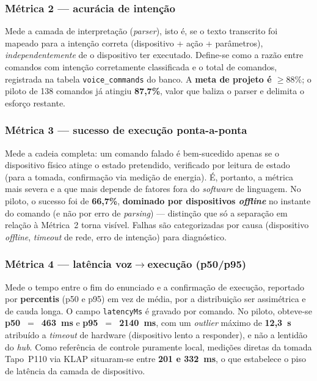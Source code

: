 \subsubsection{Métrica 2 --- acurácia de intenção}

Mede a camada de interpretação (\textit{parser}), isto é, se o texto transcrito foi
mapeado para a intenção correta (dispositivo + ação + parâmetros), \emph{independentemente}
de o dispositivo ter executado. Define-se como a razão entre comandos com intenção
corretamente classificada e o total de comandos, registrada na tabela
\texttt{voice\_commands} do banco. A \textbf{meta de projeto é $\geq 88\%$}; o piloto de
138 comandos já atingiu \textbf{87,7\%}, valor que baliza o parser e delimita o esforço
restante.

\subsubsection{Métrica 3 --- sucesso de execução ponta-a-ponta}

Mede a cadeia completa: um comando falado é bem-sucedido apenas se o dispositivo físico
atinge o estado pretendido, verificado por leitura de estado (para a tomada, confirmação
via medição de energia). É, portanto, a métrica mais severa e a que mais depende de
fatores fora do \textit{software} de linguagem. No piloto, o sucesso foi de
\textbf{66,7\%}, \textbf{dominado por dispositivos \textit{offline}} no instante do
comando (e não por erro de \textit{parsing}) --- distinção que só a separação em relação
à Métrica~2 torna visível. Falhas são categorizadas por causa (dispositivo \textit{offline},
\textit{timeout} de rede, erro de intenção) para diagnóstico.

\subsubsection{Métrica 4 --- latência voz$\rightarrow$execução (p50/p95)}

Mede o tempo entre o fim do enunciado e a confirmação de execução, reportado por
\textbf{percentis} (p50 e p95) em vez de média, por a distribuição ser assimétrica e de
cauda longa. O campo \texttt{latencyMs} é gravado por comando. No piloto, obteve-se
\textbf{p50~$=$~463~ms} e \textbf{p95~$=$~2140~ms}, com um \textit{outlier} máximo de
\textbf{12,3~s} atribuído a \textit{timeout} de hardware (dispositivo lento a responder),
e não a lentidão do \textit{hub}. Como referência de controle puramente local, medições
diretas da tomada Tapo~P110 via KLAP situaram-se entre \textbf{201 e 332~ms}, o que
estabelece o piso de latência da camada de dispositivo.


